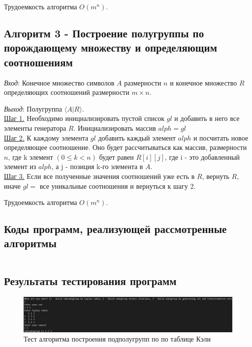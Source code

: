 \documentclass[spec, och, labwork]{shiza}
\begin{document}
        Трудоемкость алгоритма $O(m^n)$.\\
    \subsection{Алгоритм 3 - Построение полугруппы по порождающему множеству и определяющим соотношениям}

        \textit{Вход}: Конечное множество символов $A$ размерности $n$ и конечное множество $R$ определяющих соотношений размерности $m \times n$.

        \textit{Выход}: Полугруппа $\langle A | R \rangle$.\\
        \underline{Шаг 1.} Необходимо инициализировать пустой список $gl$ и добавить в него все элементы генератора $R$.
        Инициализировать массив $alph = gl$\\
        \underline{Шаг 2.} К каждому элемента $gl$ добавить каждый элемент $alph$ и посчитать новое определяющее соотношение.
        Оно будет рассчитываться как массив, размерности $n$, где k элемент $(0 \leq k < n)$ будет равен $R[i][j]$, где i -
        это добавленный элемент из $alph$, а j - позиция k-го элемента в $A$.\\
        \underline{Шаг 3.} Если все полученные значения соотношений уже есть в $R$, вернуть $R$, иначе $gl = $ все уникальные соотношения
        и вернуться к шагу 2.

        Трудоемкость алгоритма $O(m^n)$.\\
    
        \subsection{Коды программ, реализующей рассмотренные алгоритмы}
            \inputminted[fontsize=\small]{python}{../code/lab4.py}
        \subsection{Результаты тестирования программ}

        \begin{figure}[H]
            \centering      %
            \includegraphics[width=1.\textwidth]{pic/1}
            \caption{Тест алгоритма построения подполугрупп по по таблице Кэли}
            \label{fig:image1}
        \end{figure}
\end{document}
